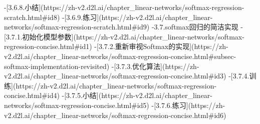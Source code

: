 -[3.6.8.小结](https://zh-v2.d2l.ai/chapter_linear-networks/softmax-regression-scratch.html#id8)
-[3.6.9.练习](https://zh-v2.d2l.ai/chapter_linear-networks/softmax-regression-scratch.html#id9)
-3.7.softmax回归的简洁实现
-[3.7.1.初始化模型参数](https://zh-v2.d2l.ai/chapter_linear-networks/softmax-regression-concise.html#id1)
-[3.7.2.重新审视Softmax的实现](https://zh-v2.d2l.ai/chapter_linear-networks/softmax-regression-concise.html#subsec-softmax-implementation-revisited)
-[3.7.3.优化算法](https://zh-v2.d2l.ai/chapter_linear-networks/softmax-regression-concise.html#id3)
-[3.7.4.训练](https://zh-v2.d2l.ai/chapter_linear-networks/softmax-regression-concise.html#id4)
-[3.7.5.小结](https://zh-v2.d2l.ai/chapter_linear-networks/softmax-regression-concise.html#id5)
-[3.7.6.练习](https://zh-v2.d2l.ai/chapter_linear-networks/softmax-regression-concise.html#id6)